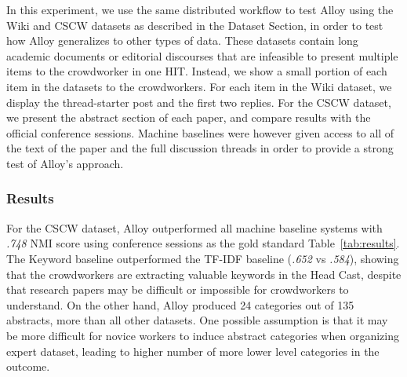 

In this experiment, we use the same distributed workflow to test Alloy 
using the Wiki and CSCW datasets as described in the Dataset Section, in order
to test how Alloy generalizes to other types of data. These datasets contain long
academic documents or editorial discourses that are infeasible to present multiple items to the crowdworker in one HIT.
Instead, we show a small portion of each item in the datasets to the crowdworkers.
For each item
in the Wiki dataset, we display the thread-starter post and the first two replies. For the CSCW dataset,
we present the abstract
section of each paper, and compare results with the official conference sessions. Machine baselines were however given
access to all of the text of the paper and the full discussion threads in order to provide a strong test of Alloy's approach.


\subsubsection*{Results}


For the CSCW dataset, Alloy outperformed all machine baseline
systems with \emph{.748} NMI score using conference sessions as the gold standard Table~\ref{tab:results}.
The Keyword baseline outperformed the TF-IDF baseline (\emph{.652} vs \emph{.584}), showing
that the crowdworkers are extracting valuable keywords in the Head Cast, despite that
research papers may be difficult or impossible for crowdworkers to understand. On the other hand,
Alloy produced 24 categories out of 135 abstracts, more than all other datasets. One possible
assumption is that it may be more difficult for novice workers to induce abstract categories
when organizing expert dataset, leading to higher number of more lower level categories in
the outcome.

